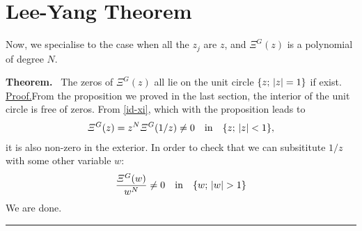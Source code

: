 \documentclass[aps, 12pt]{revtex4-2}
\begin{document}
\section{Lee-Yang Theorem}
Now, we specialise to the case when all the $z_j$ are $z$, and $\varXi^{G}(z)$ is a polynomial of degree $N$.

\noindent
\textbf{Theorem.} \, The zeros of $\varXi^G(z)$ all lie on the unit circle $\qty{z; \,\qty|z| = 1}$ if exist. \\
\underline{Proof.}\quad From the proposition we proved in the last section, the interior of the unit circle is free of zeros. From \eqref{id-xi}, which with the proposition leads to
\begin{align} 
  \varXi^{G}(z) = z^N \varXi^{G}(1/z) \ne 0 \quad \text{in} \quad \qty{z;\, \qty|z| < 1},
\end{align}
it is also non-zero in the exterior. In order to check that we can subsititute $1/z$ with some other variable $w$:
\begin{dmath}
  \frac{\varXi^G(w)}{w^N} \ne 0 \quad \text{in} \quad \qty{w; \, \qty|w| > 1}
\end{dmath}
We are done. \hfill \rule{1.5mm}{3.5mm}


\end{document}
